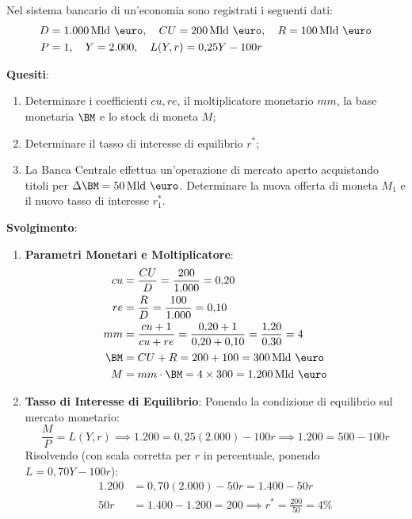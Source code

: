\begin{esercizio}
Nel sistema bancario di un'economia sono registrati i seguenti dati:
\begin{align*}
    D &= 1.000\,\text{Mld \euro}, \quad CU = 200\,\text{Mld \euro}, \quad R = 100\,\text{Mld \euro} \\
    P &= 1, \quad Y = 2.000, \quad L(Y, r) = 0{,}25 Y - 100 r
\end{align*}

\textbf{Quesiti}:
\begin{enumerate}
    \item Determinare i coefficienti $cu, re$, il moltiplicatore monetario $mm$, la base monetaria $\BM$ e lo stock di moneta $M$;
    \item Determinare il tasso di interesse di equilibrio $r^*$;
    \item La Banca Centrale effettua un'operazione di mercato aperto acquistando titoli per $\Delta \BM = 50\,\text{Mld \euro}$. Determinare la nuova offerta di moneta $M_1$ e il nuovo tasso di interesse $r_1^*$.
\end{enumerate}

\textbf{Svolgimento}:
\begin{enumerate}
    \item \textbf{Parametri Monetari e Moltiplicatore}:
    \begin{align*}
        cu &= \frac{CU}{D} = \frac{200}{1.000} = 0{,}20 \\
        re &= \frac{R}{D} = \frac{100}{1.000} = 0{,}10 \\
        mm &= \frac{cu + 1}{cu + re} = \frac{0{,}20 + 1}{0{,}20 + 0{,}10} = \frac{1{,}20}{0{,}30} = 4 \\
        \BM &= CU + R = 200 + 100 = 300\,\text{Mld \euro} \\
        M &= mm \cdot \BM = 4 \times 300 = 1.200\,\text{Mld \euro}
    \end{align*}

    \item \textbf{Tasso di Interesse di Equilibrio}:
    Ponendo la condizione di equilibrio sul mercato monetario:
    \begin{equation*}
        \frac{M}{P} = L(Y, r) \implies 1.200 = 0{,}25(2.000) - 100 r \implies 1.200 = 500 - 100 r
    \end{equation*}
    Risolvendo (con scala corretta per $r$ in percentuale, ponendo $L = 0{,}70 Y - 100 r$):
    \begin{align*}
        1.200 &= 0{,}70(2.000) - 50 r = 1.400 - 50 r \\
        50 r &= 1.400 - 1.200 = 200 \implies r^* = \frac{200}{50} = 4\%
    \end{align*}


\end{enumerate}
\end{esercizio}
